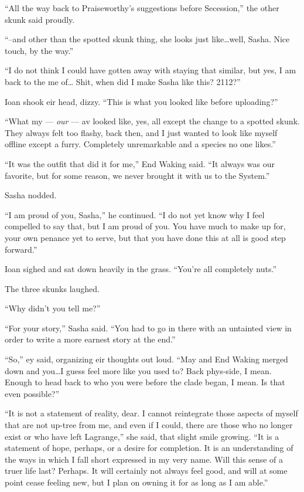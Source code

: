 ``All the way back to Praiseworthy's suggestions before Secession,'' the other skunk said proudly.

``--and other than the spotted skunk thing, she looks just like\ldots well, Sasha. Nice touch, by the way.''

``I do not think I could have gotten away with staying that similar, but yes, I am back to the me of\ldots{} Shit, when did I make Sasha like this? 2112?''

Ioan shook eir head, dizzy. ``This is what you looked like before uploading?''

``What my — \emph{our} — av looked like, yes, all except the change to a spotted skunk. They always felt too flashy, back then, and I just wanted to look like myself offline except a furry. Completely unremarkable and a species no one likes.''

``It was the outfit that did it for me,'' End Waking said. ``It always was our favorite, but for some reason, we never brought it with us to the System.''

Sasha nodded.

``I am proud of you, Sasha,'' he continued. ``I do not yet know why I feel compelled to say that, but I am proud of you. You have much to make up for, your own penance yet to serve, but that you have done this at all is good step forward.''

Ioan sighed and sat down heavily in the grass. ``You're all completely nuts.''

The three skunks laughed.

``Why didn't you tell me?''

``For your story,'' Sasha said. ``You had to go in there with an untainted view in order to write a more earnest story at the end.''

``So,'' ey said, organizing eir thoughts out loud. ``May and End Waking merged down and you\ldots I guess feel more like you used to? Back phys-side, I mean. Enough to head back to who you were before the clade began, I mean. Is that even possible?''

``It is not a statement of reality, dear. I cannot reintegrate those aspects of myself that are not up-tree from me, and even if I could, there are those who no longer exist or who have left Lagrange,'' she said, that slight smile growing. ``It is a statement of hope, perhaps, or a desire for completion. It is an understanding of the ways in which I fall short expressed in my very name. Will this sense of a truer life last? Perhaps. It will certainly not always feel good, and will at some point cease feeling new, but I plan on owning it for as long as I am able.''


